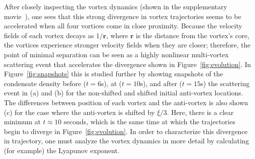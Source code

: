 After closely inspecting the vortex dynamics (shown in the supplementary movie~\cite{movie}), one sees that this strong divergence in vortex trajectories seems to be accelerated when all four vortices come in close proximity.
Because the velocity fields of each vortex decays as $1/\mathbf{r}$, where $\mathbf{r}$ is the distance from the vortex's core, the vortices experience stronger velocity fields when they are closer; therefore, the point of minimal separation can be seen as a highly nonlinear multi-vortex scattering event that accelerates the divergence shown in Figure~\ref{fig:evolution}.
In Figure~\ref{fig:snapshots} this is studied further by showing snapshots of the condensate density before ($t = 6$s), at ($t = 10$s), and after ($t = 15$s) the scattering event in (a) and (b) for the non-shifted and shifted initial anti-vortex locations.
The differences between position of each vortex and the anti-vortex is also shown (c) for the case where the anti-vortex is shifted by $\xi/3$.
Here, there is a clear minimum at $t \approx 10$ seconds, which is the same time at which the  trajectories begin to diverge in Figure~\ref{fig:evolution}.
In order to characterize this divergence in trajectory, one must analyze the vortex dynamics in more detail by calculating (for example) the Lyapunov exponent.

